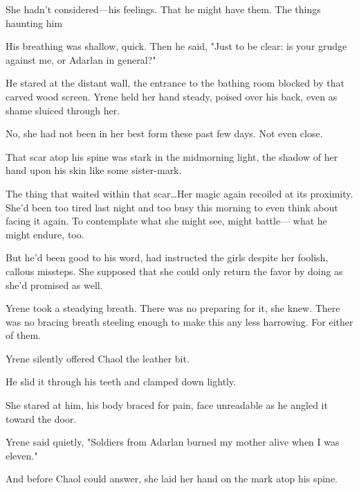 She hadn't considered---his feelings.
That he might have them.
The things haunting him 

His breathing was shallow, quick.
Then he said, "Just to be clear: is your grudge against me, or Adarlan in general?"

He stared at the distant wall, the entrance to the bathing room blocked by that carved wood screen.
Yrene held her hand steady, poised over his back, even as shame sluiced through her.

No, she had not been in her best form these past few days.
Not even close.

That scar atop his spine was stark in the midmorning light, the shadow of her hand upon his skin like some sister-mark.

The thing that waited within that scar\ldots Her magic again recoiled at its proximity.
She'd been too tired last night and too busy this morning to even think about facing it again.
To contemplate what she might see, might battle--- what he might endure, too.

But he'd been good to his word, had instructed the girls despite her foolish, callous missteps.
She supposed that she could only return the favor by doing as she'd promised as well.

Yrene took a steadying breath.
There was no preparing for it, she knew.
There was no bracing breath steeling enough to make this any less harrowing.
For either of them.

Yrene silently offered Chaol the leather bit.

He slid it through his teeth and clamped down lightly.

She stared at him, his body braced for pain, face unreadable as he angled it toward the door.

Yrene said quietly, "Soldiers from Adarlan burned my mother alive when I was eleven."

And before Chaol could answer, she laid her hand on the mark atop his spine.

